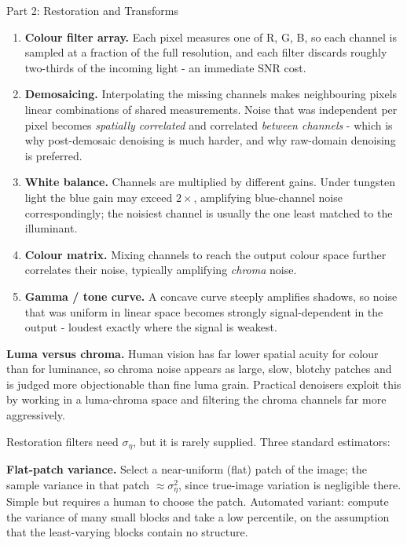 \documentclass[letterpaper]{article}
\begin{document}
\begin{notes}{Part 2: Restoration and Transforms}
\begin{enumerate}
    \item \textbf{Colour filter array.} Each pixel measures one of R, G, B, so each channel is sampled at a fraction of the full resolution, and each filter discards roughly two-thirds of the incoming light - an immediate SNR cost.
    \item \textbf{Demosaicing.} Interpolating the missing channels makes neighbouring pixels linear combinations of shared measurements. Noise that was independent per pixel becomes \emph{spatially correlated} and correlated \emph{between channels} - which is why post-demosaic denoising is much harder, and why raw-domain denoising is preferred.
    \item \textbf{White balance.} Channels are multiplied by different gains. Under tungsten light the blue gain may exceed $2\times$, amplifying blue-channel noise correspondingly; the noisiest channel is usually the one least matched to the illuminant.
    \item \textbf{Colour matrix.} Mixing channels to reach the output colour space further correlates their noise, typically amplifying \emph{chroma} noise.
    \item \textbf{Gamma / tone curve.} A concave curve steeply amplifies shadows, so noise that was uniform in linear space becomes strongly signal-dependent in the output - loudest exactly where the signal is weakest.
\end{enumerate}

\textbf{Luma versus chroma.} Human vision has far lower spatial acuity for colour than for luminance, so chroma noise appears as large, slow, blotchy patches and is judged more objectionable than fine luma grain. Practical denoisers exploit this by working in a luma-chroma space and filtering the chroma channels far more aggressively.


Restoration filters need $\sigma_\eta$, but it is rarely supplied. Three standard estimators:

\textbf{Flat-patch variance.} Select a near-uniform (flat) patch of the image; the sample variance in that patch $\approx\sigma_\eta^2$, since true-image variation is negligible there. Simple but requires a human to choose the patch. Automated variant: compute the variance of many small blocks and take a low percentile, on the assumption that the least-varying blocks contain no structure.


\end{notes}
\end{document}
